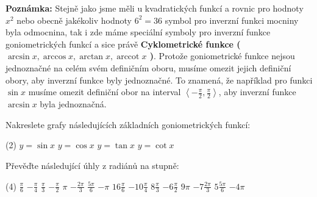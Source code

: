 \documentclass[12pt,a4paper]{article}
\DeclareMathOperator{\arccot}{arccot}
\begin{document}
\begin{notebox}
    \textbf{Poznámka:} Stejně jako jsme měli u kvadratických funkcí a rovnic pro hodnoty $x^2$ nebo obecně jakékoliv hodnoty $6^2 = 36$
    symbol pro inverzní funkci mocniny byla odmocnina, tak i zde máme speciální symboly pro inverzní funkce goniometrických funkcí a sice právě \textbf{Cyklometrické funkce ($\arcsin x, \arccos x, \arctan x, \arccot x$ )}.
    Protože goniometrické funkce nejsou jednoznačné na celém svém definičním oboru, musíme omezit jejich definiční obory, aby inverzní funkce byly jednoznačné.
    To znamená, že například pro funkci \textbf{$\sin x$} musíme omezit definiční obor na interval $\left\langle -\frac{\pi}{2}, \frac{\pi}{2} \right\rangle$,
    aby inverzní funkce \textbf{$\arcsin x$} byla jednoznačná.
\end{notebox}



\exercisepart
\setcounter{section}{1}
\begin{exercise}
    Nakreslete grafy následujících základních goniometrických funkcí:
    \begin{tasks}(2)
        \task $y = \sin x $
        \task $y = \cos x $
        \task $y = \tan x $
        \task $y = \cot x $
    \end{tasks}
\end{exercise}


\begin{exercise}
    Převěďte následující úhly z radiánů na stupně:
    \begin{tasks}(4)
        \task $\frac{\pi}{6} $
        \task $-\frac{\pi}{4} $
        \task $\frac{\pi}{3} $
        \task $-\frac{\pi}{2} $
        \task $\pi $
        \task $-\frac{2\pi}{3} $ 
        \task $\frac{5\pi}{6} $
        \task $- \pi $
        \task $16\frac{\pi}{6} $
        \task $-10\frac{\pi}{4} $
        \task $8\frac{\pi}{3} $
        \task $-6\frac{\pi}{2} $
        \task $9\pi $
        \task $-7\frac{2\pi}{3} $
        \task $5\frac{5\pi}{6} $
        \task $-4\pi $
    \end{tasks}
\end{exercise}
\end{document}
